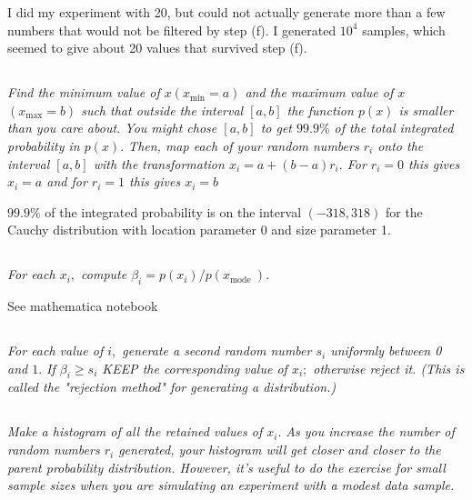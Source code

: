 \documentclass{article}
\begin{document}
I did my experiment with 20, but could not actually generate more than a few numbers that would not be filtered by step (f). I generated $10^4$ samples, which seemed to give about 20 values that survived step (f). 

\subsection{}
\textit{Find the minimum value of $x\left(x_{\min }=a\right)$ and the maximum value of $x$ $\left(x_{\max }=b\right)$ such that outside the interval $[a, b]$ the function $p(x)$ is smaller than you care about. You might chose $[a, b]$ to get $99.9 \%$ of the total integrated probability in $p(x) .$ Then, map each of your random numbers $r_{i}$ onto the interval $[a, b]$ with the transformation $x_{i}=a+(b-a) r_{i} .$ For $r_{i}=0$ this gives $x_{i}=a$ and for $r_{i}=1$ this gives $x_{i}=b$}

$99.9\%$ of the integrated probability is on the interval $(-318, 318)$ for the Cauchy distribution with location parameter 0 and size parameter 1. 


\subsection{}
\textit{For each $x_{i},$ compute $\beta_{i}=p\left(x_{i}\right) / p\left(x_{\text {mode }}\right)$.}

See mathematica notebook


\subsection{}
\textit{For each value of $i,$ generate a second random number $s_{i}$ uniformly between 0 and $1 .$ If $\beta_{i} \geq s_{i}$ KEEP the corresponding value of $x_{i} ;$ otherwise reject it. (This is called the "rejection method" for generating a distribution.)}



\subsection{}
\textit{Make a histogram of all the retained values of $x_{i} .$ As you increase the number of random numbers $r_{i}$ generated, your histogram will get closer and closer to the parent probability distribution. However, it's useful to do the exercise for small sample sizes when you are simulating an experiment with a modest data sample.}
\end{document}
